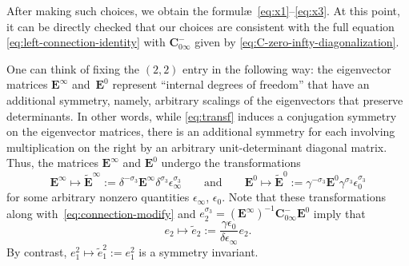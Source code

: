 \documentclass[pdftex]{sigma}
\numberwithin{equation}{section}
\begin{document}
After making such choices, we obtain the formul\ae\ \eqref{eq:x1}--\eqref{eq:x3}. At this point, it can be directly checked that our choices are consistent with the full equation \eqref{eq:left-connection-identity} with $\mathbf C_{0\infty}^-$ given by \eqref{eq:C-zero-infty-diagonalization}.

One can think of fixing the $(2,2)$ entry in the following way: the eigenvector matrices $\mathbf{E}^\infty$ and~$\mathbf{E}^0$ represent ``internal degrees of freedom'' that have an additional symmetry, namely, arbitrary scalings of the eigenvectors that preserve determinants. In other words, while \eqref{eq:transf} induces a conjugation symmetry on the eigenvector matrices, there is an additional symmetry for each involving multiplication on the right by an arbitrary unit-determinant diagonal matrix. Thus, the matrices $\mathbf{E}^\infty$ and $\mathbf{E}^0$ undergo the transformations
 \begin{equation*}
 \mathbf{E}^{\infty}\mapsto \widetilde{\mathbf{E}}^\infty:=\delta^{-\sigma_3}\mathbf{E}^\infty\delta^{\sigma_3}\epsilon_\infty^{\sigma_3}\qquad\text{and}\qquad
 \mathbf{E}^{0}\mapsto \widetilde{\mathbf{E}}^0:=\gamma^{-\sigma_3}\mathbf{E}^0\gamma^{\sigma_3}\epsilon_0^{\sigma_3}
 \end{equation*}
 for some arbitrary nonzero quantities $\epsilon_\infty$, $\epsilon_0$. Note that these transformations along with~\eqref{eq:connection-modify} and $e_2^{\sigma_3}=(\mathbf{E}^\infty)^{-1}\mathbf{C}_{0\infty}^-\mathbf{E}^0$ imply that
 \begin{equation*}
 e_2\mapsto\widetilde{e}_2:=\frac{\gamma\epsilon_0}{\delta\epsilon_\infty}e_2.
 \end{equation*}
 By contrast, $e_1^2\mapsto\widetilde{e}_1^2:=e_1^2$ is a symmetry invariant.
\end{document}
